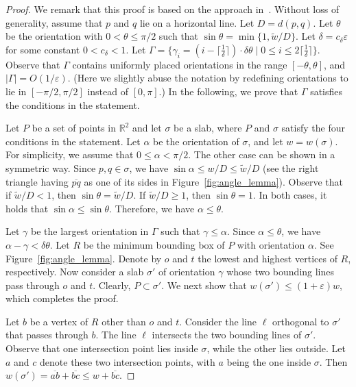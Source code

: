 \documentclass[10pt,a4paper]{article}
\theoremstyle{star}
\theoremstyle{claimstar}
\newcommand{\eps}{\ensuremath{\varepsilon}}
\begin{document}
\begin{proof}
    We remark that this proof is based on the approach in~\cite{agarwalTwo}.
    Without loss of generality, assume that $p$ and $q$ lie on a horizontal line. 
    Let $D = d(p, q)$. 
    Let $\theta$ be the orientation with $0< \theta \le \pi/2$ such that $\sin\theta = \min \{1, \widetilde w/{D} \}$.
    Let $\delta =  c_\delta \eps$ for some constant $0 < c_\delta < 1$. 
    Let $\Gamma = \{\gamma_i = (i- \lceil \frac{1}{\delta}\rceil)\cdot \delta\theta  \mid 0 \le i \le 2\lceil \frac{1}{\delta}\rceil \}$.
    Observe that $\Gamma$ contains uniformly placed orientations in the range $[-\theta, \theta]$, and $|\Gamma| = O(1/\eps)$. (Here we slightly abuse the notation by redefining orientations to lie in $[-\pi/2, \pi/2]$ instead of $[0, \pi]$.)
    In the following, we prove that $\Gamma$ satisfies the conditions in the statement.

    Let $P$ be a set of points in $\mathbb{R}^2$ and let $\sigma$ be a slab, where $P$ and $\sigma$ satisfy the four conditions in the statement.
    Let $\alpha$ be the orientation of $\sigma$, and let $w = w(\sigma)$. 
    For simplicity, we assume that $0\le \alpha < \pi/2$. The other case can be shown in a symmetric way. 
    Since $p, q \in \sigma$, we have $\sin \alpha \le w/D \le \widetilde w/D$ (see the right triangle having $\overline{pq}$ as one of its sides in Figure~\ref{fig:angle_lemma}).
    Observe that if $\widetilde w/ D < 1$, then $\sin \theta = \widetilde w/ D$. If $\widetilde w/ D \ge 1$, then $\sin \theta =1$. In both cases, it holds that $\sin \alpha \le \sin \theta$. Therefore, we have $\alpha \le \theta$. 


     Let $\gamma$ be the largest orientation in $\Gamma$ such that $\gamma \le \alpha$. 
     Since $ \alpha \le  \theta$, we have $\alpha - \gamma < \delta \theta$. 
     Let $R$ be the minimum bounding box of $P$ with orientation $\alpha$. See Figure~\ref{fig:angle_lemma}.
     Denote by $o$ and $t$ the lowest and highest vertices of $R$, respectively. 
    Now consider a slab $\sigma'$ of orientation $\gamma$ whose two bounding lines pass through $o$ and $t$. 
    Clearly, $P \subset \sigma'$. 
    We next show that $w(\sigma') \le (1+\eps)w$, which completes the proof.

    Let $b$ be a vertex of $R$ other than $o$ and $t$. 
    Consider the line $\ell$ orthogonal to $\sigma'$ that passes through $b$. 
    The line $\ell$ intersects the two bounding lines of $\sigma'$. 
    Observe that one intersection point lies inside $\sigma$, while the other lies outside. 
    Let $a$ and $c$ denote these two intersection points, with $a$ being the one inside $\sigma$. 
    Then $w(\sigma') = \overline{ab} + \overline{bc} \le w + \overline{bc}$.


\end{proof}
\end{document}
